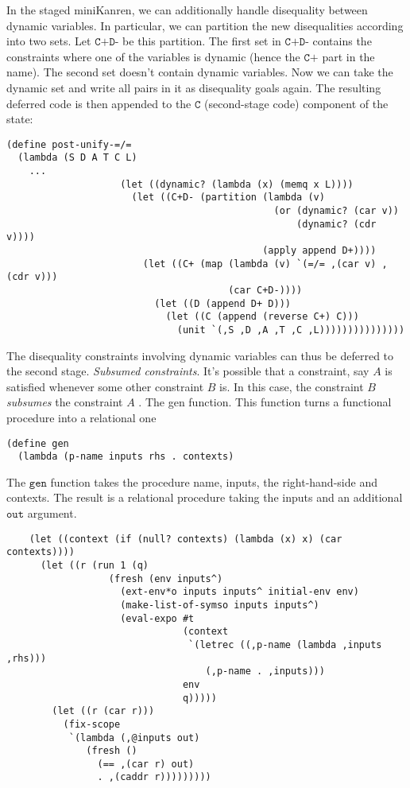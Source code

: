 \documentclass[11pt]{article}
\theoremstyle{definition}
\newcommand{\code}[1]{\texttt{#1}}
\newcommand\tab[1][1cm]{\hspace*{#1}}
\begin{document}
In the staged miniKanren, we can additionally handle disequality between dynamic variables. In particular, we can partition the new disequalities according into two sets. Let $\code{C+D-}$ be this partition. The first set in $\code{C+D-}$ contains the constraints where one of the variables is dynamic (hence the $\code{C+}$ part in the name). The second set doesn't contain dynamic variables. Now we can take the dynamic set and write all pairs in it as disequality goals again. The resulting deferred code is then appended to the $\code{C}$ (second-stage code) component of the state:
\begin{lstlisting}
(define post-unify-=/=
  (lambda (S D A T C L)
    ...
	                (let ((dynamic? (lambda (x) (memq x L))))
                      (let ((C+D- (partition (lambda (v)
                                               (or (dynamic? (car v))
                                                   (dynamic? (cdr v))))
                                             (apply append D+))))
                        (let ((C+ (map (lambda (v) `(=/= ,(car v) ,(cdr v)))
                                       (car C+D-))))
                          (let ((D (append D+ D)))
                            (let ((C (append (reverse C+) C)))
                              (unit `(,S ,D ,A ,T ,C ,L)))))))))))))))
\end{lstlisting}
The disequality constraints involving dynamic variables can thus be deferred to the second stage. \newline 
\tab \textit{Subsumed constraints}.
It's possible that a constraint, say $A$ is satisfied whenever some other constraint $B$ is. In this case, the constraint $B$ \textit{subsumes} the constraint $A$ \cite{byrd2010relational}. \newline 
\tab The gen function.
This function turns a functional procedure into a relational one
\begin{lstlisting}
(define gen
  (lambda (p-name inputs rhs . contexts)
\end{lstlisting}
The $\code{gen}$ function takes the procedure name, inputs, the right-hand-side and contexts. The result is a relational procedure taking the inputs and an additional $\code{out}$ argument.
\begin{lstlisting}
    (let ((context (if (null? contexts) (lambda (x) x) (car contexts))))
      (let ((r (run 1 (q)
                  (fresh (env inputs^)
                    (ext-env*o inputs inputs^ initial-env env)
                    (make-list-of-symso inputs inputs^)
                    (eval-expo #t
                               (context
                                `(letrec ((,p-name (lambda ,inputs ,rhs)))
                                   (,p-name . ,inputs)))
                               env
                               q)))))
        (let ((r (car r)))
          (fix-scope
           `(lambda (,@inputs out)
              (fresh ()
                (== ,(car r) out)
                . ,(caddr r)))))))))
\end{lstlisting}
\end{document}
